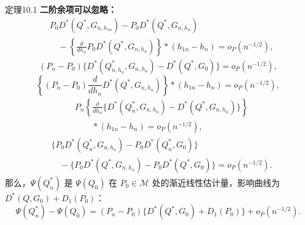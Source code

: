 \begin{bookresult}{定理}{10.1}
\noindent\textbf{二阶余项可以忽略：}
\[
 \begin{aligned}
 &P_0D^*(Q^*,G_{n,h_{1n}})-P_0D^*(Q^*,G_{n,h_n})\\
 &\quad-\left\{\frac{d}{dh_n}P_0D^*(Q^*,G_{n,h_n})\right\}
       \ast(h_{1n}-h_n)=o_P(n^{-1/2}),
 \end{aligned}
\]
\[
 (P_n-P_0)\{D^*(Q_{n,h_n}^*,G_{n,h_n})-D^*(Q^*,G_0)\}
 =o_P(n^{-1/2}),
\]
\[
 \left\{(P_n-P_0)\frac{d}{dh_n}D^*(Q^*,G_{n,h_n})\right\}
 \ast(h_{1n}-h_n)=o_P(n^{-1/2}),
\]
\[
 \begin{aligned}
 &P_n\left\{\frac{d}{dh_n}
   \{D^*(Q_n^*,G_{n,h_n})-D^*(Q^*,G_{n,h_n})\}\right\}\\
 &\qquad\ast(h_{1n}-h_n)=o_P(n^{-1/2}),
 \end{aligned}
\]
\[
 \begin{aligned}
 &\{P_0D^*(Q_n^*,G_{n,h_n})-P_0D^*(Q_n^*,G_0)\}\\
 &\quad-\{P_0D^*(Q^*,G_{n,h_n})-P_0D^*(Q^*,G_0)\}
 =o_P(n^{-1/2}).
 \end{aligned}
\]
那么，$\Psi(Q_n^*)$ 是 $\Psi(Q_0)$ 在 $P_0\in\mathcal M$ 处的渐近线性估计量，影响曲线为 $D^*(Q,G_0)+D_1(P_0)$：
\[
 \Psi(Q_n^*)-\Psi(Q_0)
 =(P_n-P_0)\{D^*(Q^*,G_0)+D_1(P_0)\}+o_P(n^{-1/2}).
\]
\end{bookresult}

